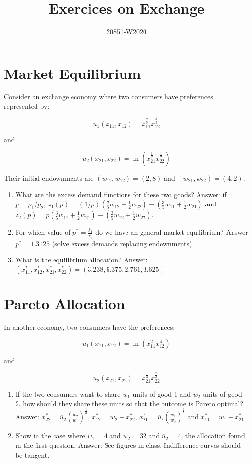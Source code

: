 \documentclass[11pt, oneside,french]{article}   	%
\title{Exercices on Exchange}
\author{20851-W2020}
\date{}							%
\begin{document}
\maketitle

\section*{Market Equilibrium}

Consider an exchange economy where two consumers have preferences represented by: 

$$ u_1(x_{11},x_{12}) = x_{11}^{\frac{2}{5}}x_{12}^{\frac{3}{5}} $$

and 

$$ u_2(x_{21},x_{22}) = \ln \left(x_{21}^{\frac{1}{2}}x_{22}^{\frac{1}{2}} \right)$$

Their initial endownments are $(w_{11},w_{12}) = (2,8)$ and $(w_{21},w_{22}) = (4,2)$.
\begin{enumerate}
    \item What are the excess demand functions for these two goods?  Answer: if $p = p_1/p_2$, $z_1(p) = (1/p)\left( \frac{2}{5}w_{12} + \frac{1}{2}w_{22}\right) - \left( \frac{3}{5}w_{11} + \frac{1}{2}w_{21}\right)  $ and $z_2(p) = p\left( \frac{3}{5}w_{11} + \frac{1}{2}w_{21}\right) - \left( \frac{2}{5}w_{12} + \frac{1}{2}w_{22}\right)$. 
    \item For which value of $p^* = \frac{p_1}{p_2}$ do we have an general market equilibrium? Answer $p^* = 1.3125$ (solve excess demands replacing endownments). 
    \item What is the equilibrium allocation? Answer: $(x^*_{11},x^*_{12},x^*_{21},x^*_{22}) = (3.238,6.375,2.761,3.625)$
\end{enumerate}

\section*{Pareto Allocation}

In another economy, two consumers have the preferences: 


$$ u_1(x_{11},x_{12}) = \ln \left(x_{11}^{2}x_{12}^{4} \right)$$

and 

$$ u_2(x_{21},x_{22}) = x_{21}^{\frac{1}{3}}x_{22}^{\frac{2}{3}} $$

\begin{enumerate}
    \item If the two consumers want to share $w_1$ units of good 1 and $w_2$ units of good 2, how should they share these units so that the outcome is Pareto optimal? Answer: $x^*_{22} = \overline{u}_2 \left( \frac{w_2}{w_1}\right)^{\frac{1}{3}}$, $x^*_{12} = w_2 - x^*_{22}$, $x^*_{21} = \overline{u}_2 \left( \frac{w_1}{w_2}\right)^{\frac{2}{3}}$ and $x^*_{11} = w_1 - x^*_{21}$.
    \item Show in the case where $w_1 = 4$ and $w_2 = 32$ and $\overline{u}_2=4$, the allocation found in the first question. Answer: See figures in class. Indifference curves should be tangent. 
    
\end{enumerate}
\end{document}
